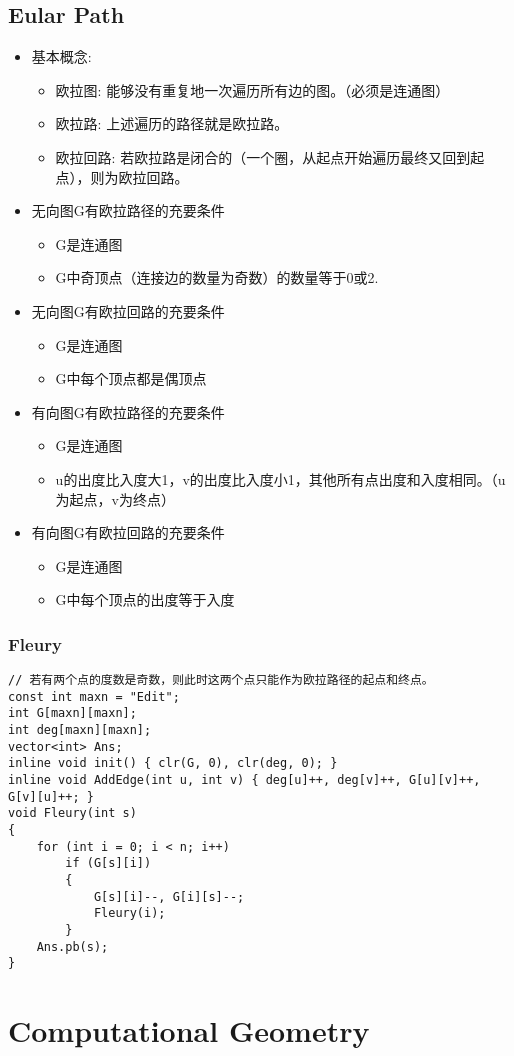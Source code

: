 \documentclass[twoside]{article}
\begin{document}
\subsection{Eular Path}
\begin{itemize}
\item  基本概念:
    \begin{itemize}
    \item 欧拉图: 能够没有重复地一次遍历所有边的图。（必须是连通图）
    \item 欧拉路: 上述遍历的路径就是欧拉路。
    \item 欧拉回路: 若欧拉路是闭合的（一个圈，从起点开始遍历最终又回到起点），则为欧拉回路。
    \end{itemize}
\item 无向图G有欧拉路径的充要条件
    \begin{itemize}
    \item G是连通图
    \item G中奇顶点（连接边的数量为奇数）的数量等于0或2.
    \end{itemize}
\item 无向图G有欧拉回路的充要条件
    \begin{itemize}
    \item G是连通图
    \item G中每个顶点都是偶顶点
    \end{itemize}
\item 有向图G有欧拉路径的充要条件
    \begin{itemize}
    \item G是连通图
    \item u的出度比入度大1，v的出度比入度小1，其他所有点出度和入度相同。（u为起点，v为终点）
    \end{itemize}
\item 有向图G有欧拉回路的充要条件
    \begin{itemize}
    \item G是连通图
    \item G中每个顶点的出度等于入度
    \end{itemize}
\end{itemize}
\subsubsection{Fleury}
\begin{lstlisting}
// 若有两个点的度数是奇数，则此时这两个点只能作为欧拉路径的起点和终点。
const int maxn = "Edit";
int G[maxn][maxn];
int deg[maxn][maxn];
vector<int> Ans;
inline void init() { clr(G, 0), clr(deg, 0); }
inline void AddEdge(int u, int v) { deg[u]++, deg[v]++, G[u][v]++, G[v][u]++; }
void Fleury(int s)
{
    for (int i = 0; i < n; i++)
        if (G[s][i])
        {
            G[s][i]--, G[i][s]--;
            Fleury(i);
        }
    Ans.pb(s);
}
\end{lstlisting}
\clearpage\section{Computational Geometry}
\end{document}
